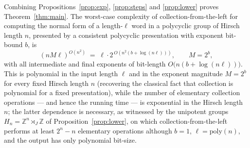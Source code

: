 \documentclass{amsart}
\theoremstyle{definition}
\begin{document}
Combining Propositions~\ref{prop:exp}, \ref{prop:steps} and \ref{prop:lower} proves
Theorem~\ref{thm:main}. The worst-case complexity of collection-from-the-left for computing
the normal form of a length-$\ell$ word in a polycyclic group of Hirsch length $n$, presented
by a consistent polycyclic presentation with exponent bit-bound $b$, is
\[
(nM\ell)^{O(n^2)}\;=\;\ell\cdot 2^{\,O(n^2(b+\log(n\ell)))},\qquad M=2^b,
\]
with all intermediate and final exponents of bit-length $O\!\bigl(n(b+\log(n\ell))\bigr)$. This
is polynomial in the input length $\ell$ and in the exponent magnitude $M=2^b$ for every fixed
Hirsch length $n$ (recovering the classical fact that collection is polynomial for a fixed
presentation), while the number of elementary collection operations — and hence the running
time — is exponential in the Hirsch length $n$; the latter dependence is necessary, as
witnessed by the unipotent groups $H_n=\mathbb Z^n\rtimes_J\mathbb Z$ of
Proposition~\ref{prop:lower}, on which collection-from-the-left performs at least $2^n-n$
elementary operations although $b=1$, $\ell=\mathrm{poly}(n)$, and the output has only
polynomial bit-size.
\end{document}
